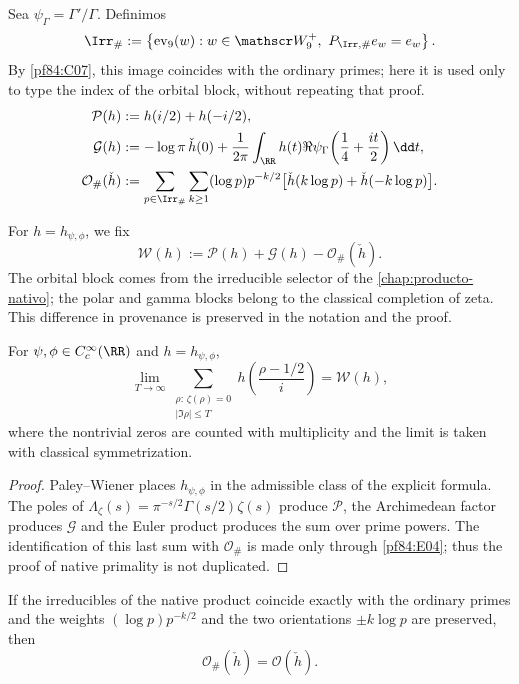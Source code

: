 Sea \(\psi_\Gamma=\Gamma'/\Gamma\). Definimos
\[
 \Irr_\#:=
 \left\{\operatorname{ev}_9(w):
 w\in\mathscr W_9^+,\ 
 P_{\Irr,\#}e_w=e_w\right\}.
\]
By \cref{pf84:C07}, this image coincides with the ordinary primes; here it is
used only to type the index of the orbital block, without repeating that
proof.
\begin{align}
 \mathcal P(h)&:=h(i/2)+h(-i/2),\\
 \mathcal G(h)&:=-\log\pi\,\check h(0)
 +\frac1{2\pi}\int_{\RR}h(t)
 \Re\psi_\Gamma\!\left(\frac14+\frac{it}{2}\right)\dd t,\\
 \mathcal O_\#(\check h)&:=
 \sum_{p\in\Irr_\#}\sum_{k\ge1}
 (\log p)p^{-k/2}
 \bigl[\check h(k\log p)+\check h(-k\log p)\bigr].
\end{align}

\begin{definition}
\label{pf84:E02}
For \(h=h_{\psi,\phi}\), we fix
\[
 \mathcal W(h):=\mathcal P(h)+\mathcal G(h)
 -\mathcal O_\#(\check h).
\]
The orbital block comes from the irreducible selector of the
\cref{chap:producto-nativo}; the polar and gamma blocks belong to the
classical completion of zeta. This difference in provenance is preserved in
the notation and the proof.
\end{definition}

\begin{theorem}
\label{pf84:E03}
For \(\psi,\phi\in C_c^\infty(\RR)\) and \(h=h_{\psi,\phi}\),
\[
 \lim_{T\to\infty}
 \sum_{\substack{\rho:\,\zeta(\rho)=0\\|\Im\rho|\le T}}
 h\!\left(\frac{\rho-1/2}{i}\right)
 =\mathcal W(h),
\]
where the nontrivial zeros are counted with multiplicity and the limit is
taken with classical symmetrization.
\end{theorem}

\begin{proof}
Paley--Wiener places \(h_{\psi,\phi}\) in the admissible class of the explicit
formula. The poles of
\(\Lambda_\zeta(s)=\pi^{-s/2}\Gamma(s/2)\zeta(s)\) produce
\(\mathcal P\), the Archimedean factor produces \(\mathcal G\) and the Euler
product produces the sum over prime powers. The identification of this
last sum with \(\mathcal O_\#\) is made only through
\cref{pf84:E04}; thus the proof of native primality is not duplicated.
\end{proof}

\begin{proposition}
\label{pf84:E04}
If the irreducibles of the native product coincide exactly with the ordinary
primes and the weights
\((\log p)p^{-k/2}\) and the two orientations \(\pm k\log p\) are preserved, then
\[
 \mathcal O_\#(\check h)=\mathcal O(\check h).
\]
\end{proposition}

